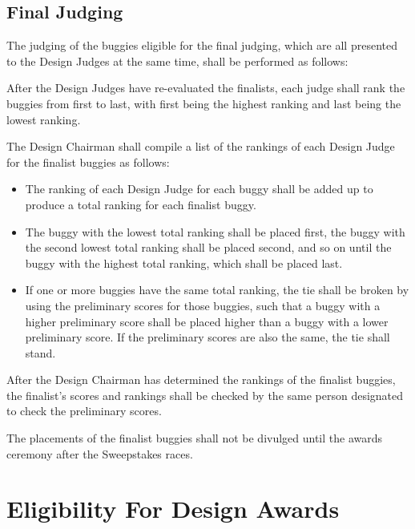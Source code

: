 \subsection{Final Judging}

	The judging of the buggies eligible for the final judging, which are all
	presented to the Design Judges at the same time, shall be performed as follows:
	\newline

	After the Design Judges have re-evaluated the finalists, each judge shall rank
	the buggies from first to last, with first being the highest ranking and last
	being the lowest ranking.

	The Design Chairman shall compile a list of the rankings of each Design Judge
	for the finalist buggies as follows:

	\begin{itemize}

		\item
		The ranking of each Design Judge for each buggy shall be added up to produce a
		total ranking for each finalist buggy.

		\item
		The buggy with the lowest total ranking shall be placed first, the buggy with
		the second lowest total ranking shall be placed second, and so on until the
		buggy with the highest total ranking, which shall be placed last.

		\item
		If one or more buggies have the same total ranking, the tie shall be broken by
		using the preliminary scores for those buggies, such that a buggy with a higher
		preliminary score shall be placed higher than a buggy with a lower preliminary
		score. If the preliminary scores are also the same, the tie shall stand.

	\end{itemize}	

	After the Design Chairman has determined the rankings of the finalist buggies,
	the finalist's scores and rankings shall be checked by the same person
	designated to check the preliminary scores.

	The placements of the finalist buggies shall not be divulged until the awards
	ceremony after the Sweepstakes races.

\section{Eligibility For Design Awards}

